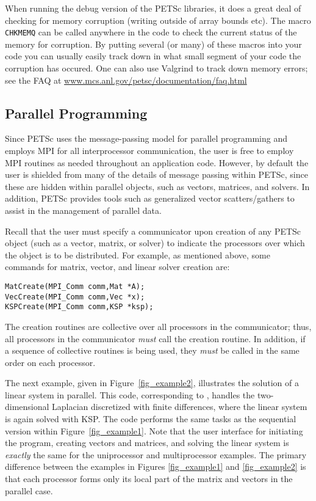 When running the debug version of the PETSc libraries, it
does a great deal of checking for memory corruption (writing outside of
array bounds etc). The macro \lstinline{CHKMEMQ} can be called
anywhere in the code to check the current status of the memory for corruption.
By putting several (or many) of these macros into your code you can usually
easily track down in what small segment of your code the corruption has occured.
One can also use Valgrind to track down memory errors; see the FAQ at
\href{https://www.mcs.anl.gov/petsc/documentation/faq.html}{www.mcs.anl.gov/petsc/documentation/faq.html}

\subsection*{Parallel Programming}
Since PETSc uses the message-passing model for
parallel programming and employs MPI for all interprocessor
communication, the user is free to employ MPI routines as needed
throughout an application code.  However, by default the user is
shielded from many of the details of message passing within PETSc,
since these are hidden within parallel objects, such as vectors,
matrices, and solvers.  In addition, PETSc provides tools such as
generalized vector scatters/gathers to assist
in the management of parallel data.

Recall that the user must specify a communicator upon creation of any
PETSc object (such as a vector, matrix, or solver) to indicate the
processors over which the object is to be distributed.  For example,
as mentioned above, some commands for matrix, vector, and linear solver
creation are:
\begin{lstlisting}
MatCreate(MPI_Comm comm,Mat *A);
VecCreate(MPI_Comm comm,Vec *x);
KSPCreate(MPI_Comm comm,KSP *ksp);
\end{lstlisting}
The creation routines are collective over all processors in the
communicator; thus, all processors in the communicator {\em must}
call the creation routine.  In addition, if a sequence of
collective routines is being used, they {\em must} be called
in the same order on each processor.

The next example, given in Figure~\ref{fig_example2}, illustrates the
solution of a linear system in parallel.  This code, corresponding to
\href{https://www.mcs.anl.gov/petsc/petsc-current/src/ksp/ksp/tutorials/ex3.c.html}{}, handles the
two-dimensional Laplacian discretized with finite differences, where
the linear system is again solved with KSP.  The code performs the
same tasks as the sequential version within Figure~\ref{fig_example1}.
Note that the user interface for initiating the program, creating
vectors and matrices, and solving the linear system is {\em exactly}
the same for the uniprocessor and multiprocessor examples.  The
primary difference between the examples in Figures \ref{fig_example1}
and \ref{fig_example2} is that each processor forms only its local
part of the matrix and vectors in the parallel case.

